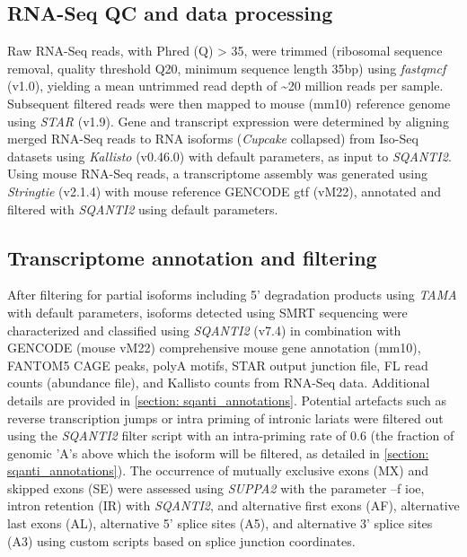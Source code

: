 \subsection{RNA-Seq QC and data processing}
Raw RNA-Seq reads, with Phred (Q) > 35, were trimmed (ribosomal sequence removal, quality threshold Q20, minimum sequence length 35bp) using \textit{fastqmcf} (v1.0), yielding a mean untrimmed read depth of \textasciitilde20 million reads per sample. Subsequent filtered reads were then mapped to mouse (mm10) reference genome using \textit{STAR}\cite{Dobin2013} (v1.9). Gene and transcript expression were determined by aligning merged RNA-Seq reads to RNA isoforms (\textit{Cupcake} collapsed) from Iso-Seq datasets using \textit{Kallisto}\cite{Bray2016} (v0.46.0) with default parameters, as input to \textit{SQANTI2}. Using mouse RNA-Seq reads, a transcriptome assembly was generated using \textit{Stringtie}\cite{Pertea2015} (v2.1.4) with mouse reference GENCODE gtf (vM22), annotated and filtered with \textit{SQANTI2} using default parameters. 

\subsection{Transcriptome annotation and filtering}
\label{ch4: transcriptome_annotation}
After filtering for partial isoforms including 5’ degradation products using \textit{TAMA} with default parameters, isoforms detected using SMRT sequencing were characterized and classified using \textit{SQANTI2} (v7.4) in combination with GENCODE (mouse vM22) comprehensive mouse gene annotation (mm10), FANTOM5 CAGE peaks, polyA motifs, STAR output junction file, FL read counts (abundance file), and Kallisto counts from RNA-Seq data. Additional details are provided in \cref{section: sqanti_annotations}. Potential artefacts such as reverse transcription jumps or intra priming of intronic lariats were filtered out using the \textit{SQANTI2} filter script with an intra-priming rate of 0.6 (the fraction of genomic 'A's above which the isoform will be filtered, as detailed in \cref{section: sqanti_annotations}). The occurrence of mutually exclusive exons (MX) and skipped exons (SE) were assessed using \textit{SUPPA2}\cite{Trincado2018} with the parameter –f ioe, intron retention (IR) with \textit{SQANTI2}, and alternative first exons (AF), alternative last exons (AL), alternative 5’ splice sites (A5), and alternative 3’ splice sites (A3) using custom scripts based on splice junction coordinates. 


